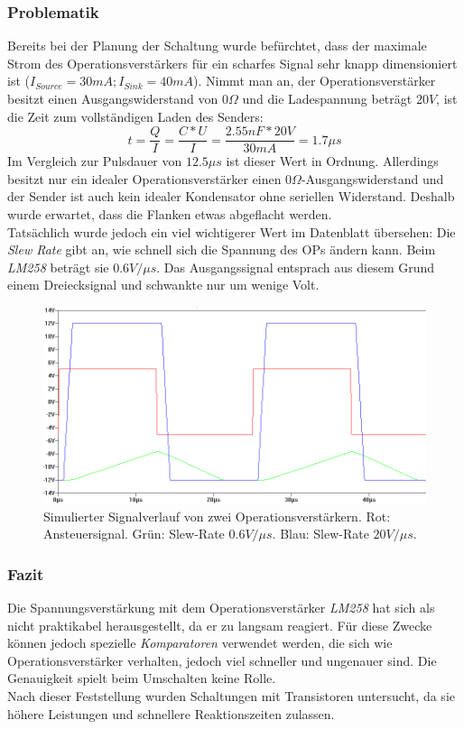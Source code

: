 \subsubsection{Problematik}
Bereits bei der Planung der Schaltung wurde befürchtet, dass der maximale Strom des Operationsverstärkers für ein scharfes Signal sehr knapp dimensioniert ist ($I_{Source}=30mA; I_{Sink}=40mA$). Nimmt man an, der Operationsverstärker besitzt einen Ausgangswiderstand von $0 \Omega$ und die Ladespannung beträgt $20V$, ist die Zeit zum vollständigen Laden des Senders:
\begin{equation}
t=\frac{Q}{I}=\frac{C*U}{I}=\frac{2.55nF*20V}{30mA}=1.7\mu s
\end{equation}
Im Vergleich zur Pulsdauer von $12.5\mu s$ ist dieser Wert in Ordnung. Allerdings besitzt nur ein idealer Operationsverstärker einen $0\Omega$-Ausgangswiderstand und der Sender ist auch kein idealer Kondensator ohne seriellen Widerstand. Deshalb wurde erwartet, dass die Flanken etwas abgeflacht werden.\\
Tatsächlich wurde jedoch ein viel wichtigerer Wert im Datenblatt übersehen: Die \textit{Slew Rate} gibt an, wie schnell sich die Spannung des OPs ändern kann. Beim \textit{LM258} beträgt sie $0.6V/\mu s$. Das Ausgangssignal entsprach aus diesem Grund einem Dreiecksignal und schwankte nur um wenige Volt.
\begin{figure}[H]
\centering
\includegraphics[scale=0.6]{images/signalverlauf_opamps.png}
\caption{Simulierter Signalverlauf von zwei Operationsverstärkern. Rot: Ansteuersignal. Grün: Slew-Rate $0.6V/\mu s$. Blau: Slew-Rate $20V/\mu s$.} \label{img:I2}
\end{figure}

\subsubsection{Fazit}
Die Spannungsverstärkung mit dem Operationsverstärker \textit{LM258} hat sich als nicht praktikabel herausgestellt, da er zu langsam reagiert. Für diese Zwecke können jedoch spezielle \textit{Komparatoren} verwendet werden, die sich wie Operationsverstärker verhalten, jedoch viel schneller und ungenauer sind. Die Genauigkeit spielt beim Umschalten keine Rolle.\\
Nach dieser Feststellung wurden Schaltungen mit Transistoren untersucht, da sie höhere Leistungen und schnellere Reaktionszeiten zulassen.


